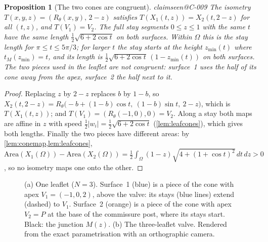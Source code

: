 \documentclass[11pt,a4paper]{article}
\makeatletter
\theoremstyle{plain}
\newtheorem{proposition}[theorem]{Proposition}
\theoremstyle{remark}
\newcommand{\claim}[1]{\ifcsname claimseen@#1\endcsname\else\expandafter\gdef\csname claimseen@#1\endcsname{}\label{claim:#1}\fi}
\makeatother
\begin{document}
\begin{proposition}[The two cones are congruent]\label{prop:congruent}\claim{C-009}
The isometry $T(x,y,z)=(R_\theta(x,y),\,2-z)$ satisfies $T(X_1(t,z))=X_2(t,2-z)$ for all $(t,z)$, and $T(V_1)=V_2$.
The full stay segments $0\le z\le1$ with the same $t$ have the same length $\tfrac12\sqrt{6+2\cos t}$ on both surfaces.
Within $\Omega$ this is the stay length for $\pi\le t\le5\pi/3$; for larger $t$ the stay starts at the height $z_{\min}(t)$
where $t_M(z_{\min})=t$, and its length is $\tfrac12\sqrt{6+2\cos t}\,(1-z_{\min}(t))$ on both surfaces. The two
\emph{pieces} used in the leaflet are not congruent: surface~1 uses the half of its cone away from the apex, surface~2 the
half next to it.
\end{proposition}
\begin{proof}
Replacing $z$ by $2-z$ replaces $b$ by $1-b$, so $X_2(t,2-z)=R_\theta\big(-b+(1-b)\cos t,\ (1-b)\sin t,\ 2-z\big)$, which is
$T(X_1(t,z))$; and $T(V_1)=(R_\theta(-1,0),0)=V_2$. Along a stay both maps are affine in $z$ with speed
$\frac12|w_i|=\frac12\sqrt{6+2\cos t}$ (\cref{lem:leafcones}), which gives both lengths. Finally the two pieces have
different areas: by \cref{lem:conemap,lem:leafcones},
$\mathrm{Area}(X_1(\Omega))-\mathrm{Area}(X_2(\Omega))=\frac12\int_\Omega(1-z)\sqrt{4+(1+\cos t)^2}\,dt\,dz>0$, so no isometry maps
one onto the other.
\end{proof}

\begin{figure}[t]\centering

\caption{(a) One leaflet ($N=3$). Surface~1 (blue) is a piece of the cone with apex $V_1=(-1,0,2)$, above the valve: its
stays (blue lines) extend (dashed) to $V_1$. Surface~2 (orange) is a piece of the cone with apex $V_2=P$ at the base of the
commissure post, where its stays start. Black: the junction $M(z)$. (b) The three-leaflet valve. Rendered from the exact
parametrisation with an orthographic camera.}
\label{fig:leaflet}
\end{figure}
\end{document}
